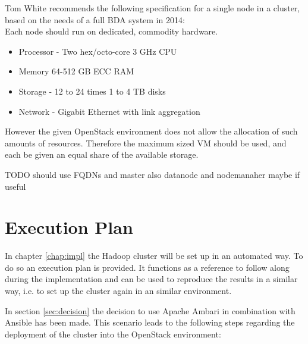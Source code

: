 Tom White recommends the following specification for a single node in a cluster, based on the needs of a full \ac{BDA} system in 2014:\\
Each node should run on dedicated, commodity hardware.
\begin{itemize}
    \item Processor - Two hex/octo-core 3 GHz \acs{CPU}
    \item Memory 64-512 \ac{GB} \ac{ECC} \ac{RAM}
    \item Storage - 12 to 24 times 1 to 4 \ac{TB} disks
    \item Network - Gigabit Ethernet with link aggregation
\end{itemize}
\autocite{white2015hadoop}

However the given OpenStack environment does not allow the allocation of such amounts of resources. Therefore the maximum sized \acs{VM} should be used, and each be given an equal share of the available storage.

TODO should use \ac{FQDN}s and master also datanode and nodemanaher maybe if useful

\section{Execution Plan}

In chapter \ref{chap:impl} the Hadoop cluster will be set up in an automated way.
To do so an execution plan is provided.
It functions as a reference to follow along during the implementation 
and can be used to reproduce the results in a similar way, i.e. to set up the cluster again in an similar environment.

In section \vref{sec:decision} the decision to use Apache Ambari in combination with Ansible has been made.
This scenario leads to the following steps regarding the deployment of the cluster into the OpenStack environment:

